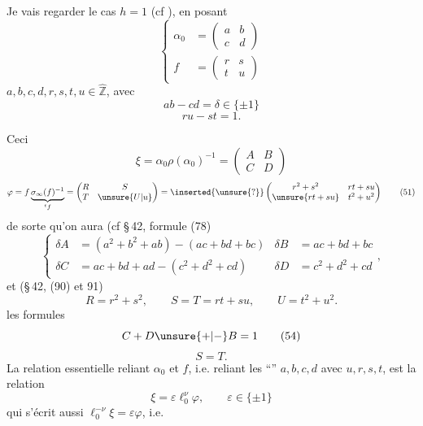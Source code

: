 

Je vais regarder le cas $h=1$ (cf ), en posant
\[
\left\{\begin{aligned}
 \alpha_0&=\begin{pmatrix}a&b\\c&d\end{pmatrix}\\
 f&=\begin{pmatrix}r&s\\t&u\end{pmatrix}
\end{aligned}\right.
\tag{47}
\]
  $a,b,c,d,r,s,t,u\in\widehat{\mathbb Z}$, avec
\[
 \boxed{ab-cd=\delta\in\{\pm1\}}
 \tag{48}
\]
\[
 \boxed{ru-st=1}.
 \tag{49}
\]

Ceci 
\[
 \xi=\alpha_0\rho(\alpha_0)^{-1}
 =\begin{pmatrix}A&B\\C&D\end{pmatrix}
 \tag{50}
\]
\[
 \varphi=f\underbrace{\sigma_\infty(f)^{-1}}_{{}^{t}f}
 =\begin{pmatrix}R&S\\T&\unsure{U|u}\end{pmatrix}
 =\inserted{\unsure{?}}
 \begin{pmatrix}r^2+s^2&rt+su\\\unsure{rt+su}&t^2+u^2\end{pmatrix}
 \tag{51}
\]
de sorte qu'on aura (cf \S\,42, formule (78)
\[
\left\{\begin{aligned}
 \delta A&=(a^2+b^2+ab)-(ac+bd+bc)
 &\delta B&=ac+bd+bc\\
 \delta C&=ac+bd+ad-(c^2+d^2+cd)
 &\delta D&=c^2+d^2+cd
\end{aligned}\right.,
\tag{52}
\]
et (\S\,42, (90) et 91)
\[
 R=r^2+s^2,\qquad S=T=rt+su,\qquad U=t^2+u^2.
 \tag{53}
\]
 les formules
\[
 C+D\unsure{+|-}B=1
 \tag{54}
\]
\[
 S=T.
 \tag{55}
\]
La relation essentielle reliant $\alpha_0$ et $f$, i.e. reliant les ``'' $a,b,c,d$ avec $u,r,s,t$, est la relation
\[
 \boxed{\xi=\varepsilon\ell_0^\nu\varphi,\qquad\varepsilon\in\{\pm1\}}
 \tag{56}
\]
qui s'écrit aussi $\ell_0^{-\nu}\xi=\varepsilon\varphi$, i.e.
